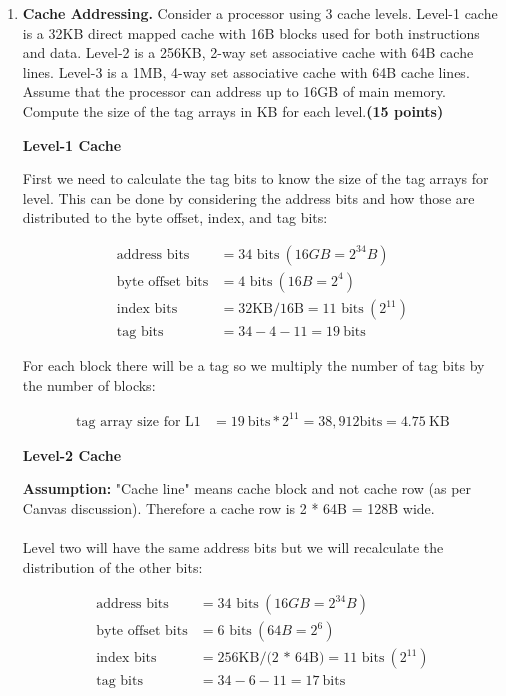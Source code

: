 \documentclass[a4paper, 11pt]{exam}
\begin{document}
\begin{enumerate}
\begin{enumerate}
\end{enumerate}



\item \textbf {Cache Addressing.} Consider a processor using 3 cache levels. Level-1 cache is a
32KB direct mapped cache with 16B blocks used for both instructions and data. Level-2 is a
256KB, 2-way set associative cache with 64B cache lines. Level-3 is a
1MB, 4-way set associative cache with 64B cache lines. Assume that the processor can
address up to 16GB of main memory.  Compute the size of the tag arrays in KB for each level.\textbf{(15 points)}


\textbf{Level-1 Cache}

First we need to calculate the tag bits to know the size of the tag arrays for level. This can be done by considering the address bits and how those are distributed to the byte offset, index, and tag bits:

\begin{align*}
\text{address bits} &= \text{34 bits} \  (16GB = 2^{34} B) \\
\text{byte offset bits} &= \text{4 bits} \ (16B = 2^4) \\
\text{index bits} &= \text{32KB/16B} = \text{11 bits} \ (2^{11})\\
\text{tag bits} &= 34 - 4 - 11 = 19 \ \text{bits}         
\end{align*}

For each block there will be a tag so we multiply the number of tag bits by the number of blocks:

\begin{align*}
\text{tag array size for L1} &= 19 \ \text{bits} * 2^{11} = 38, 912 \text{bits} = 4.75 \ \text{KB} 	
\end{align*}

\textbf{Level-2 Cache}

\textbf{Assumption:} "Cache line" means cache block and not cache row (as per Canvas discussion). Therefore a cache row is 2 * 64B = 128B wide.\\ \\
Level two will have the same address bits but we will recalculate the distribution of the other bits:

\begin{align*}
\text{address bits} &= \text{34 bits} \  (16GB = 2^{34} B) \\
\text{byte offset bits} &= \text{6 bits} \ (64B = 2^6) \\
\text{index bits} &= \text{256KB/(2 * 64B)} = \text{11 bits} \ (2^{11})\\
\text{tag bits} &= 34 - 6 - 11 =  17 \ \text{bits}         
\end{align*}


\end{enumerate}
\end{document}

